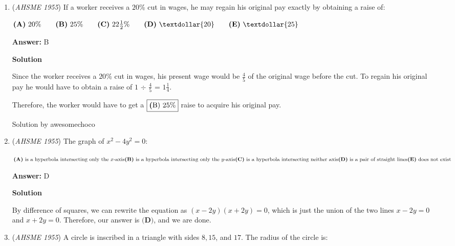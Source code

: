 \begin{enumerate}
 -Brudder

 Edited by Andrew Lu  (originally answer was C)

 


	\item (\textit{AHSME 1955}) If a worker receives a $20$\% cut in wages, he may regain his original pay exactly by obtaining a raise of:


 $\textbf{(A)}\ \text{20\%}\qquad\textbf{(B)}\ \text{25\%}\qquad\textbf{(C)}\ 22\frac{1}{2}\text{\%}\qquad\textbf{(D)}\ \textdollar{20}\qquad\textbf{(E)}\ \textdollar{25}$

 \textbf{Answer: }B



\textbf{Solution}

Since the worker receives a $20$\% cut in wages, his present wage would be $\frac{4}{5}$ of the original wage before the cut. To regain his original pay he would have to obtain a raise of $1$ $\div$ $\frac{4}{5}$ = $1$$\frac{1}{4}$.

 Therefore, the worker would have to get a $\fbox{{\textbf(B)} 25\%}$ raise to acquire his original pay.

 Solution by awesomechoco

 


	\item (\textit{AHSME 1955}) The graph of $x^2-4y^2=0$: 


 $\textbf{(A)}\ \text{is a hyperbola intersecting only the }x\text{-axis}\\ \textbf{(B)}\ \text{is a hyperbola intersecting only the }y\text{-axis}\\ \textbf{(C)}\ \text{is a hyperbola intersecting neither axis}\\ \textbf{(D)}\ \text{is a pair of straight lines}\\ \textbf{(E)}\ \text{does not exist}$

 \textbf{Answer: }D



\textbf{Solution}

By difference of squares, we can rewrite the equation as $(x-2y)(x+2y) = 0$, which is just the union of the two lines $x - 2y = 0$ and $x + 2y = 0$. Therefore, our answer is $\boxed{\textbf{(D)}}$, and we are done.

 


	\item (\textit{AHSME 1955}) A circle is inscribed in a triangle with sides $8, 15$, and $17$. The radius of the circle is: 



\end{enumerate}
